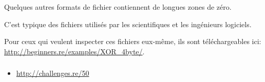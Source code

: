 Quelques autres formats de fichier contiennent de longues zones de zéro.

C'est typique des fichiers utilisés par les scientifiques et les ingénieurs logiciels.

Pour ceux qui veulent inspecter ces fichiers eux-même, ils sont téléchargeables ici:
\url{http://beginners.re/examples/XOR_4byte/}.

\subsubsection{\Exercise}

\begin{itemize}
	\item \url{http://challenges.re/50}
\end{itemize}

